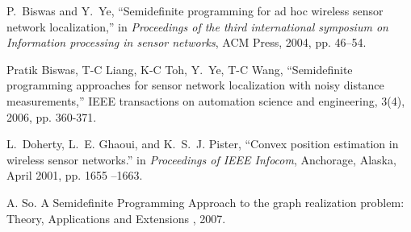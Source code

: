 \documentclass[10pt]{article}
\begin{document}
\begin{thebibliography}{1}
P.~Biswas and Y.~Ye, ``Semidefinite programming for ad hoc wireless sensor
  network localization,'' in \emph{Proceedings of the third international
  symposium on Information processing in sensor networks}, ACM Press, 2004, pp. 46--54.

Pratik Biswas, T-C Liang, K-C Toh, Y.~Ye, T-C Wang, ``Semidefinite programming approaches for sensor network localization with noisy distance measurements,'' IEEE transactions on automation science and engineering, 3(4), 2006, pp. 360-371.

L.~Doherty, L.~E. Ghaoui, and K.~S.~J. Pister, ``Convex position estimation in
  wireless sensor networks.'' in \emph{Proceedings of IEEE Infocom}, Anchorage,
  Alaska, April 2001, pp. 1655 --1663.

A. So.
\newblock A Semidefinite Programming Approach to the graph realization problem: Theory, Applications and Extensions
, 2007.

\end{thebibliography}
\end{document}
